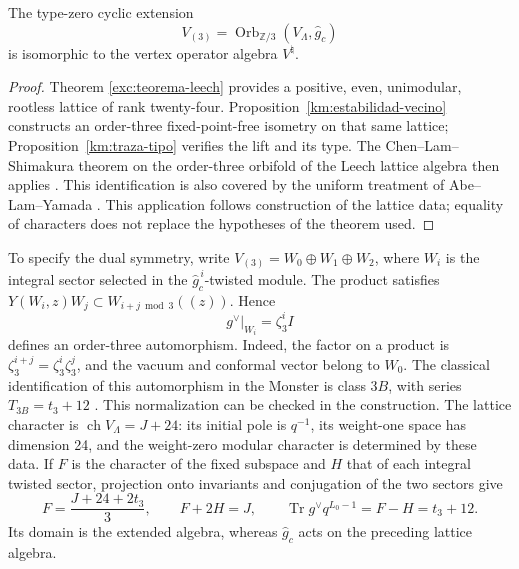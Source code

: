 \begin{theorem}
\label{km:moonshine-tres}
The type-zero cyclic extension
\begin{equation}
 V_{(3)}=\operatorname{Orb}_{\mathbb Z/3}
                 (V_\Lambda,\widehat g_c)
 \label{km:extension-orden3}
\end{equation}
is isomorphic to the vertex operator algebra \(V^\natural\).
\end{theorem}
\begin{proof}
Theorem \ref{exc:teorema-leech} provides a positive,
even, unimodular, rootless lattice of rank twenty-four.
Proposition~\ref{km:estabilidad-vecino} constructs an order-three
fixed-point-free isometry on that same lattice;
Proposition~\ref{km:traza-tipo} verifies the lift and its type.
The Chen--Lam--Shimakura theorem on the order-three orbifold
of the Leech lattice algebra then applies
\cite[Theorem~1.1]{chenlamshimakura2016}. This identification is also covered
by the uniform treatment of Abe--Lam--Yamada
\cite[Theorem~4.4 and Sections~2--4]{abelamyamada2017}. This application follows construction
of the lattice data; equality of characters does not replace the
hypotheses of the theorem used.
\end{proof}

To specify the dual symmetry, write
\(V_{(3)}=W_0\oplus W_1\oplus W_2\), where \(W_i\) is the
integral sector selected in the \(\widehat g_c^{\,i}\)-twisted module.
The product satisfies
\(Y(W_i,z)W_j\subset W_{i+j\bmod3}((z))\). Hence
\begin{equation}
 g^\vee|_{W_i}=\zeta_3^i I
 \label{km:dual-ciclico}
\end{equation}
defines an order-three automorphism. Indeed, the factor on a
product is \(\zeta_3^{i+j}=\zeta_3^i\zeta_3^j\), and the vacuum and
conformal vector belong to \(W_0\). The classical identification of
this automorphism in the Monster is class \(3B\), with series
\(T_{3B}=t_3+12\) \cite{kmconwaynorton1979,borcherds}.
This normalization can be checked in the construction. The lattice
character is \(\operatorname{ch}V_\Lambda=J+24\): its initial pole
is \(q^{-1}\), its weight-one space has dimension 24, and the
weight-zero modular character is determined by these data.
If \(F\) is the character of the fixed subspace and \(H\) that of each
integral twisted sector, projection onto invariants and conjugation
of the two sectors give
\[
 F=\frac{J+24+2t_3}{3},\qquad F+2H=J,
 \qquad \operatorname{Tr}g^\vee q^{L_0-1}=F-H=t_3+12.
\]
Its domain is the extended algebra, whereas
\(\widehat g_c\) acts on the preceding lattice algebra.

